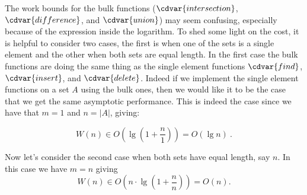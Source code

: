 


\begin{gram}
  The work bounds for the bulk functions ($\cdvar{intersection}$,
  $\cdvar{difference}$, and $\cdvar{union}$) may seem confusing,
  especially because of the expression inside the logarithm.  To shed
  some light on the cost, it is helpful to consider two cases, the
  first is when one of the sets is a single element and the other when
  both sets are equal length.  In the first case the bulk functions
  are doing the same thing as the single element functions
  $\cdvar{find}$, $\cdvar{insert}$, and $\cdvar{delete}$.  Indeed if
  we implement the single element functions on a set $A$ using the
  bulk ones, then we would like it to be
  the case that we get the same asymptotic performance.  This is
  indeed the case since we have that $m = 1$ and $n = |A|$, giving:

\[W(n) \in O\left(\lg \left(1 + \frac{n}{1}\right)\right) 
= O(\lg n)~.\]

Now let's consider the second case when both sets have equal length,
say $n$.   In this case we have $m = n$ giving
\[
W(n) \in O\left(n \cdot \lg \left(1+\frac{n}{n}\right)\right) = O(n).
\]
\end{gram}



